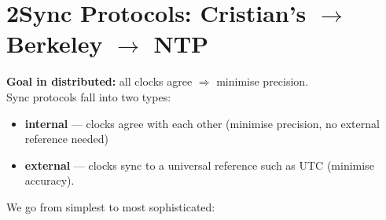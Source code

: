 \documentclass[10pt,a4paper]{article}
\begin{document}
\section*{2\quad Sync Protocols: Cristian's $\to$ Berkeley $\to$ NTP}
\textbf{Goal in distributed:} all clocks agree $\Rightarrow$ minimise precision. \\[6pt]
Sync protocols fall into two types:
\begin{itemize}
  \item \textbf{internal} --- clocks agree with each other (minimise precision, no external reference needed)
  \item \textbf{external} --- clocks sync to a universal reference such as UTC (minimise accuracy).
\end{itemize} \vspace{0.5em}
We go from simplest to most sophisticated: \\
\end{document}

